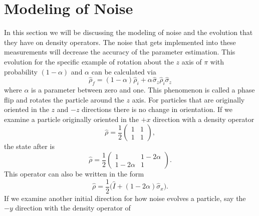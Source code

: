 \documentclass[twocolumn]{article}
\begin{document}
\section*{Modeling of Noise}
In this section we will be discussing the modeling of noise and the evolution that they have on density operators. The noise that gets implemented into these measurements will decrease the accuracy of the parameter estimation. This evolution for the specific example of rotation about the $z$ axis of $\pi$ with probability $(1-\alpha)$ and $\alpha$ can be calculated via
\begin{equation} \label{eq:86}
\hat{\rho}_f=(1-\alpha)\hat{\rho}_i+\alpha\hspace{1pt}\hat{\sigma}_z\hat{\rho}_i\hat{\sigma}_z
\end{equation}
where $\alpha$ is a parameter between zero and one. This phenomenon is called a phase flip and rotates the particle around the $z$ axis. For particles that are originally oriented in the $z$ and $-z$ directions there is no change in orientation. If we examine a particle originally oriented in the $+x$ direction with a density operator 
\begin{equation} \label{eq:87}
\hat{\rho}=\frac{1}{2}
\begin{pmatrix}
1 & 1 \\
1 & 1
\end{pmatrix},
\end{equation}
the state after is
\begin{equation} \label{eq:88}
\hat{\rho}=\frac{1}{2}
\begin{pmatrix}
1 & 1-2\alpha \\
1-2\alpha & 1
\end{pmatrix}.
\end{equation}
This operator can also be written in the form
\begin{equation} \label{eq:89}
\hat{\rho}=\frac{1}{2}\big(\hat{I}+(1-2\alpha)\hat{\sigma}_x\big).
\end{equation}
If we examine another initial direction for how noise evolves a particle, say the $-y$ direction with the density operator of 
\end{document}
